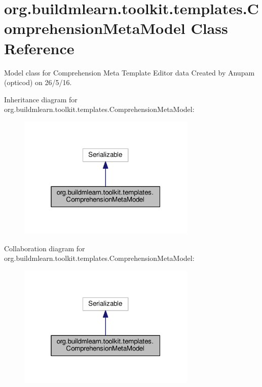 \hypertarget{classorg_1_1buildmlearn_1_1toolkit_1_1templates_1_1ComprehensionMetaModel}{}\section{org.\+buildmlearn.\+toolkit.\+templates.\+Comprehension\+Meta\+Model Class Reference}
\label{classorg_1_1buildmlearn_1_1toolkit_1_1templates_1_1ComprehensionMetaModel}


Model class for Comprehension Meta Template Editor data Created by Anupam (opticod) on 26/5/16.  




Inheritance diagram for org.\+buildmlearn.\+toolkit.\+templates.\+Comprehension\+Meta\+Model\+:
\nopagebreak
\begin{figure}[H]
\begin{center}
\leavevmode
\includegraphics[width=241pt]{classorg_1_1buildmlearn_1_1toolkit_1_1templates_1_1ComprehensionMetaModel__inherit__graph}
\end{center}
\end{figure}


Collaboration diagram for org.\+buildmlearn.\+toolkit.\+templates.\+Comprehension\+Meta\+Model\+:
\nopagebreak
\begin{figure}[H]
\begin{center}
\leavevmode
\includegraphics[width=241pt]{classorg_1_1buildmlearn_1_1toolkit_1_1templates_1_1ComprehensionMetaModel__coll__graph}
\end{center}
\end{figure}
